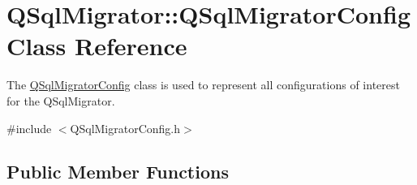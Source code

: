 \hypertarget{class_q_sql_migrator_1_1_q_sql_migrator_config}{}\section{Q\+Sql\+Migrator\+:\+:Q\+Sql\+Migrator\+Config Class Reference}
\label{class_q_sql_migrator_1_1_q_sql_migrator_config}


The \hyperlink{class_q_sql_migrator_1_1_q_sql_migrator_config}{Q\+Sql\+Migrator\+Config} class is used to represent all configurations of interest for the Q\+Sql\+Migrator.  




{\ttfamily \#include $<$Q\+Sql\+Migrator\+Config.\+h$>$}

\subsection*{Public Member Functions}
